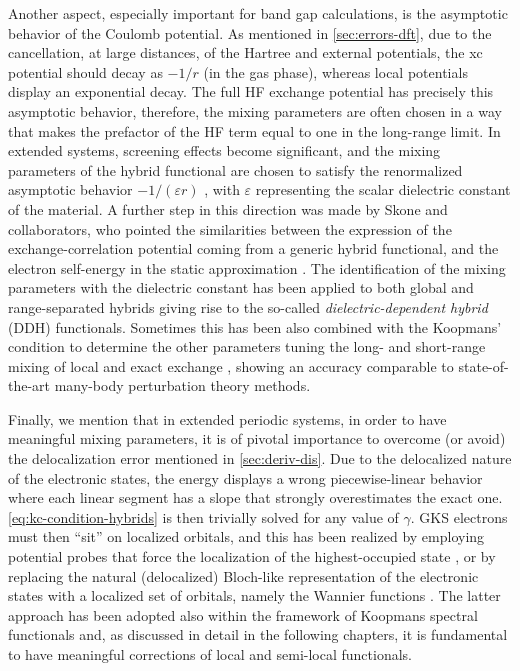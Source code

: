 Another aspect, especially important for band gap calculations, is the asymptotic behavior of the Coulomb potential. As mentioned in \cref{sec:errors-dft}, due to the cancellation, at large distances, of the Hartree and external potentials, the xc potential should decay as $-1/r$ (in the gas phase), whereas local potentials display an exponential decay. The full HF exchange potential has precisely this asymptotic behavior, therefore, the mixing parameters are often chosen in a way that makes the prefactor of the HF term equal to one in the long-range limit. In extended systems, screening effects become significant, and the mixing parameters of the hybrid functional are chosen to satisfy the renormalized asymptotic behavior $-1/(\varepsilon r)$ \cite{refaely-abramson_gap_2013}, with $\varepsilon$ representing the scalar dielectric constant of the material. A further step in this direction was made by Skone and collaborators, who pointed the similarities between the expression of the exchange-correlation potential coming from a generic hybrid functional, and the electron self-energy in the static \gw approximation \cite{skone_self-consistent_2014}.
The identification of the mixing parameters with the dielectric constant has been applied to both global \cite{miceli_nonempirical_2018,skone_self-consistent_2014} and range-separated \cite{skone_nonempirical_2016,chen_nonempirical_2018} hybrids giving rise to the so-called \emph{dielectric-dependent hybrid} (DDH) functionals. Sometimes this has been also combined with the Koopmans' condition to determine the other parameters tuning the long- and short-range mixing of local and exact exchange \cite{refaely-abramson_gap_2013}, showing an accuracy comparable to state-of-the-art many-body perturbation theory methods.

Finally, we mention that in extended periodic systems, in order to have meaningful mixing parameters, it is of pivotal importance to overcome (or avoid) the delocalization error mentioned in \cref{sec:deriv-dis}. Due to the delocalized nature of the electronic states, the energy displays a wrong piecewise-linear behavior where each linear segment has a slope that strongly overestimates the exact one. \cref{eq:kc-condition-hybrids} is then trivially solved for any value of $\gamma$. GKS electrons must then ``sit'' on localized orbitals, and this has been realized by employing potential probes that force the localization of the highest-occupied state \cite{bischoff_adjustable_2019,yang_one-shot_2022}, or by replacing the natural (delocalized) Bloch-like representation of the electronic states with a localized set of orbitals, namely the Wannier functions \cite{wing_band_2021}. The latter approach has been adopted also within the framework of Koopmans spectral functionals and, as discussed in detail in the following chapters, it is fundamental to have meaningful corrections of local and semi-local functionals.

